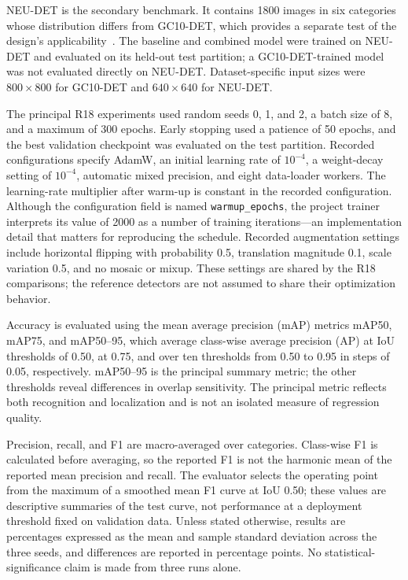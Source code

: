 \documentclass[pdflatex,sn-mathphys-num,iicol]{sn-jnl}
\begin{document}
NEU-DET is the secondary benchmark. It contains 1800 images in six categories whose distribution differs from GC10-DET, which provides a separate test of the design's applicability~\cite{he2020neudet}. The baseline and combined model were trained on NEU-DET and evaluated on its held-out test partition; a GC10-DET-trained model was not evaluated directly on NEU-DET. Dataset-specific input sizes were $800\times800$ for GC10-DET and $640\times640$ for NEU-DET.

The principal R18 experiments used random seeds 0, 1, and 2, a batch size of 8, and a maximum of 300 epochs. Early stopping used a patience of 50 epochs, and the best validation checkpoint was evaluated on the test partition. Recorded configurations specify AdamW, an initial learning rate of $10^{-4}$, a weight-decay setting of $10^{-4}$, automatic mixed precision, and eight data-loader workers. The learning-rate multiplier after warm-up is constant in the recorded configuration. Although the configuration field is named \texttt{warmup\_epochs}, the project trainer interprets its value of 2000 as a number of training iterations---an implementation detail that matters for reproducing the schedule. Recorded augmentation settings include horizontal flipping with probability 0.5, translation magnitude 0.1, scale variation 0.5, and no mosaic or mixup. These settings are shared by the R18 comparisons; the reference detectors are not assumed to share their optimization behavior.

Accuracy is evaluated using the mean average precision (mAP) metrics mAP50, mAP75, and mAP50--95, which average class-wise average precision (AP) at IoU thresholds of 0.50, at 0.75, and over ten thresholds from 0.50 to 0.95 in steps of 0.05, respectively. mAP50--95 is the principal summary metric; the other thresholds reveal differences in overlap sensitivity. The principal metric reflects both recognition and localization and is not an isolated measure of regression quality.

Precision, recall, and F1 are macro-averaged over categories. Class-wise F1 is calculated before averaging, so the reported F1 is not the harmonic mean of the reported mean precision and recall. The evaluator selects the operating point from the maximum of a smoothed mean F1 curve at IoU 0.50; these values are descriptive summaries of the test curve, not performance at a deployment threshold fixed on validation data. Unless stated otherwise, results are percentages expressed as the mean and sample standard deviation across the three seeds, and differences are reported in percentage points. No statistical-significance claim is made from three runs alone.
\end{document}
